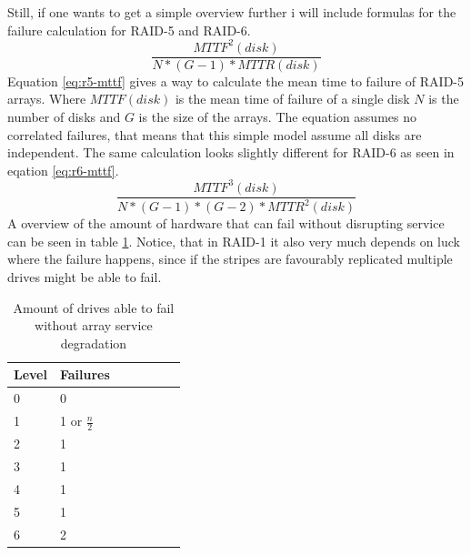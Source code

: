 \documentclass{article}
\begin{document}
Still, if one wants to get a simple overview further i
will include formulas for the failure calculation for RAID-5
and RAID-6.
\begin{equation}
    \label{eq:r5-mttf}
    \frac{MTTF^2(disk)}{N*(G-1)*MTTR(disk)}
\end{equation}
Equation \ref{eq:r5-mttf} gives a way to calculate the mean time to failure
of RAID-5 arrays.
Where \(MTTF(disk)\) is the mean time of failure of a single disk
\(N\) is the number of disks and \(G\) is the size of the arrays.
The equation assumes no correlated failures, that means that
this simple model assume all disks are independent.
The same calculation looks slightly different for RAID-6 as seen
in eqation \ref{eq:r6-mttf}. \cite{cmu:raidhighperf}
\begin{equation}
    \label{eq:r6-mttf}
    \frac
    {MTTF^3(disk)}
    {N*(G-1)*(G-2)*MTTR^2(disk)}
\end{equation}
A overview of the amount of hardware that can fail without disrupting service can be seen in table \ref{tab:reliability}.
Notice, that in RAID-1 it also very much depends on luck where the failure happens, since if the stripes are 
favourably replicated multiple drives might be able to fail. \cite{uw:raid} 

\begin{table}[h]
    \begin{tabularx}{\textwidth}{l|X|X|X|X|X|X}
        \textbf{Level} &
        Failures \\
        \hline
        0 & 0 \\
        1 & 1 or \( \frac{n}{2} \) \\
        2 & 1 \\
        3 & 1 \\
        4 & 1 \\
        5 & 1 \\
        6 & 2 \\
       \end{tabularx}
    \caption{Amount of drives able to fail without array service degradation \cite{uw:raid}}
    \label{tab:reliability}
\end{table}
\pagebreak
\end{document}

